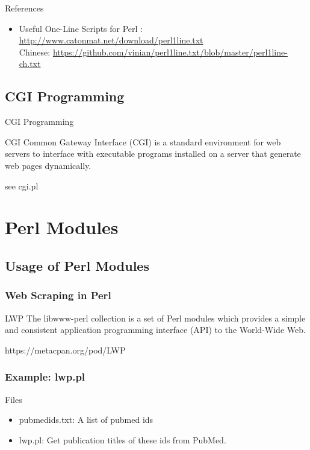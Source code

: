 \documentclass[UTF8]{beamer}
\begin{document}
\begin{frame}[t]{References}
    \begin{itemize}
        \item Useful One-Line Scripts for Perl : \url{http://www.catonmat.net/download/perl1line.txt} \\
        Chinese: \url{https://github.com/vinian/perl1line.txt/blob/master/perl1line-ch.txt}
    \end{itemize}
\end{frame}


\subsection{CGI Programming}
\begin{frame}[t]{CGI Programming}
    \begin{block}{CGI}
        Common Gateway Interface (CGI) is a standard environment for web servers to interface with executable programs installed on a server that generate web pages dynamically.
    \end{block}
    see cgi.pl
\end{frame}


\section{Perl Modules}

\subsection{Usage of Perl Modules}

\begin{frame}
  \frametitle{Web Scraping in Perl}
  \begin{block}{LWP}
    The libwww-perl collection is a set of Perl modules which provides a simple
    and consistent application programming interface (API) to the World-Wide Web.

    https://metacpan.org/pod/LWP
  \end{block}
\end{frame}

\begin{frame}
  \frametitle{Example: lwp.pl}
\begin{block}{Files}
  \begin{itemize}
    \item pubmedids.txt: A list of pubmed ids
    \item lwp.pl: Get publication titles of these ids from PubMed.
  \end{itemize}
\end{block}
\end{frame}
\end{document}
